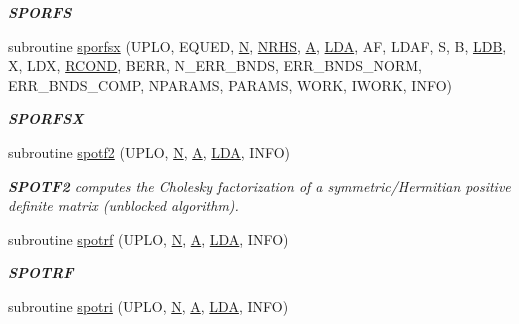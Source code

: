 \begin{DoxyCompactItemize}
\begin{DoxyCompactList}\small\item\em {\bfseries S\+P\+O\+R\+F\+S} \end{DoxyCompactList}\item 
subroutine \hyperlink{group__realPOcomputational_ga1c4ce423c2ec828b01d52cad754c5d80}{sporfsx} (U\+P\+L\+O, E\+Q\+U\+E\+D, \hyperlink{polmisc_8c_a0240ac851181b84ac374872dc5434ee4}{N}, \hyperlink{example__user_8c_aa0138da002ce2a90360df2f521eb3198}{N\+R\+H\+S}, \hyperlink{classA}{A}, \hyperlink{example__user_8c_ae946da542ce0db94dced19b2ecefd1aa}{L\+D\+A}, A\+F, L\+D\+A\+F, S, B, \hyperlink{example__user_8c_a50e90a7104df172b5a89a06c47fcca04}{L\+D\+B}, X, L\+D\+X, \hyperlink{superlu__enum__consts_8h_af00a42ecad444bbda75cde1b64bd7e72a9b5c151728d8512307565994c89919d5}{R\+C\+O\+N\+D}, B\+E\+R\+R, N\+\_\+\+E\+R\+R\+\_\+\+B\+N\+D\+S, E\+R\+R\+\_\+\+B\+N\+D\+S\+\_\+\+N\+O\+R\+M, E\+R\+R\+\_\+\+B\+N\+D\+S\+\_\+\+C\+O\+M\+P, N\+P\+A\+R\+A\+M\+S, P\+A\+R\+A\+M\+S, W\+O\+R\+K, I\+W\+O\+R\+K, I\+N\+F\+O)
\begin{DoxyCompactList}\small\item\em {\bfseries S\+P\+O\+R\+F\+S\+X} \end{DoxyCompactList}\item 
subroutine \hyperlink{group__realPOcomputational_ga7f69d6c757d6063b7827c88ec912d4f0}{spotf2} (U\+P\+L\+O, \hyperlink{polmisc_8c_a0240ac851181b84ac374872dc5434ee4}{N}, \hyperlink{classA}{A}, \hyperlink{example__user_8c_ae946da542ce0db94dced19b2ecefd1aa}{L\+D\+A}, I\+N\+F\+O)
\begin{DoxyCompactList}\small\item\em {\bfseries S\+P\+O\+T\+F2} computes the Cholesky factorization of a symmetric/\+Hermitian positive definite matrix (unblocked algorithm). \end{DoxyCompactList}\item 
subroutine \hyperlink{group__realPOcomputational_gaaf31db7ab15b4f4ba527a3d31a15a58e}{spotrf} (U\+P\+L\+O, \hyperlink{polmisc_8c_a0240ac851181b84ac374872dc5434ee4}{N}, \hyperlink{classA}{A}, \hyperlink{example__user_8c_ae946da542ce0db94dced19b2ecefd1aa}{L\+D\+A}, I\+N\+F\+O)
\begin{DoxyCompactList}\small\item\em {\bfseries S\+P\+O\+T\+R\+F} \end{DoxyCompactList}\item 
subroutine \hyperlink{group__realPOcomputational_ga4c381894bb34b1583fcc0dceafc5bea1}{spotri} (U\+P\+L\+O, \hyperlink{polmisc_8c_a0240ac851181b84ac374872dc5434ee4}{N}, \hyperlink{classA}{A}, \hyperlink{example__user_8c_ae946da542ce0db94dced19b2ecefd1aa}{L\+D\+A}, I\+N\+F\+O)

\end{DoxyCompactItemize}
